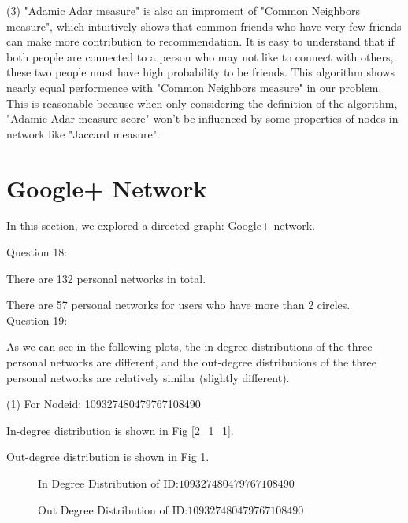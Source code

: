 \documentclass[11pt]{article}
\makeatletter
\def\maxwidth{\ifdim\Gin@nat@width>\linewidth\linewidth
    \else\Gin@nat@width\fi}
\let\Oldincludegraphics\includegraphics
\renewcommand{\includegraphics}[1]{\Oldincludegraphics[width=.8\maxwidth]{#1}}
\makeatother
\begin{document}
(3) "Adamic Adar measure" is also an improment of "Common Neighbors measure", which intuitively shows that common friends who have very few friends can make more contribution to recommendation. It is easy to understand that if both people are connected to a person who may not like to connect with others, these two people must have high probability to be friends. This algorithm shows nearly equal performence with "Common Neighbors measure" in our problem. This is reasonable because when only considering the definition of the algorithm, "Adamic Adar measure score"
won't be influenced by some properties of nodes in network like "Jaccard measure".


\section{Google+ Network}

In this section, we explored a directed graph: Google+ network.

Question 18:

There are 132 personal networks in total.

There are 57 personal networks for users who have more than 2 circles.\\

Question 19:

As we can see in the following plots, the in-degree distributions of the three personal networks are different, and the out-degree distributions of the three personal networks are relatively similar (slightly different).

(1) For Nodeid: 109327480479767108490

In-degree distribution is shown in Fig \ref{2_1_1}.

Out-degree distribution is shown in Fig \ref{2_1_2}.

\begin{figure}[h]
\centering
\begin{minipage}[t]{0.48\textwidth}
\centering
{}
\caption{In Degree Distribution of ID:$109327480479767108490$}
\label{2_1_1}
\end{minipage}
\begin{minipage}[t]{0.48\textwidth}
\centering
{}
\caption{Out Degree Distribution of ID:$109327480479767108490$}
\label{2_1_2}
\end{minipage}
\end{figure}
\end{document}

